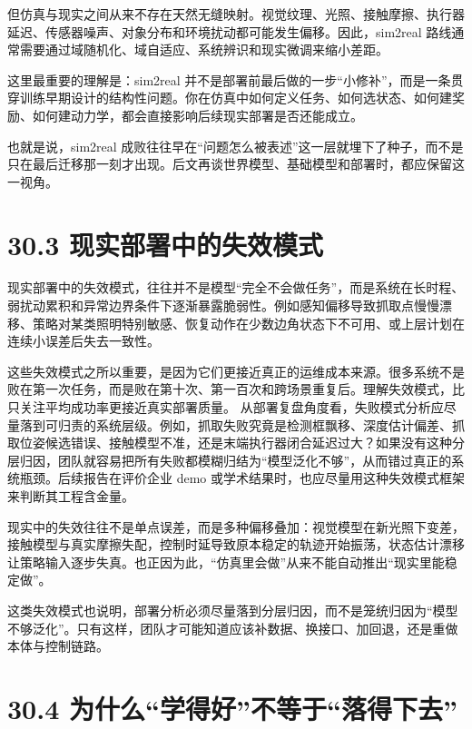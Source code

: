 但仿真与现实之间从来不存在天然无缝映射。视觉纹理、光照、接触摩擦、执行器延迟、传感器噪声、对象分布和环境扰动都可能发生偏移。因此，sim2real 路线通常需要通过域随机化、域自适应、系统辨识和现实微调来缩小差距。

这里最重要的理解是：sim2real 并不是部署前最后做的一步“小修补”，而是一条贯穿训练早期设计的结构性问题。你在仿真中如何定义任务、如何选状态、如何建奖励、如何建动力学，都会直接影响后续现实部署是否还能成立。

也就是说，sim2real 成败往往早在“问题怎么被表述”这一层就埋下了种子，而不是只在最后迁移那一刻才出现。后文再谈世界模型、基础模型和部署时，都应保留这一视角。

\section*{30.3 现实部署中的失效模式}


现实部署中的失效模式，往往并不是模型“完全不会做任务”，而是系统在长时程、弱扰动累积和异常边界条件下逐渐暴露脆弱性。例如感知偏移导致抓取点慢慢漂移、策略对某类照明特别敏感、恢复动作在少数边角状态下不可用、或上层计划在连续小误差后失去一致性。

这些失效模式之所以重要，是因为它们更接近真正的运维成本来源。很多系统不是败在第一次任务，而是败在第十次、第一百次和跨场景重复后。理解失效模式，比只关注平均成功率更接近真实部署质量。 从部署复盘角度看，失败模式分析应尽量落到可归责的系统层级。例如，抓取失败究竟是检测框飘移、深度估计偏差、抓取位姿候选错误、接触模型不准，还是末端执行器闭合延迟过大？如果没有这种分层归因，团队就容易把所有失败都模糊归结为“模型泛化不够”，从而错过真正的系统瓶颈。后续报告在评价企业 demo 或学术结果时，也应尽量用这种失效模式框架来判断其工程含金量。

现实中的失效往往不是单点误差，而是多种偏移叠加：视觉模型在新光照下变差，接触模型与真实摩擦失配，控制时延导致原本稳定的轨迹开始振荡，状态估计漂移让策略输入逐步失真。也正因为此，“仿真里会做”从来不能自动推出“现实里能稳定做”。

这类失效模式也说明，部署分析必须尽量落到分层归因，而不是笼统归因为“模型不够泛化”。只有这样，团队才可能知道应该补数据、换接口、加回退，还是重做本体与控制链路。

\section*{30.4 为什么“学得好”不等于“落得下去”}


